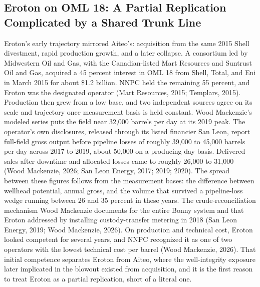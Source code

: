 \hypertarget{eroton-on-oml-18-a-partial-replication-complicated-by-a-shared-trunk-line}{%
\subsection{Eroton on OML 18: A Partial Replication Complicated by a
Shared Trunk
Line}\label{eroton-on-oml-18-a-partial-replication-complicated-by-a-shared-trunk-line}}

Eroton's early trajectory mirrored Aiteo's: acquisition from the same
2015 Shell divestment, rapid production growth, and a later collapse. A
consortium led by Midwestern Oil and Gas, with the Canadian-listed Mart
Resources and Suntrust Oil and Gas, acquired a 45 percent interest in
OML 18 from Shell, Total, and Eni in March 2015 for about \$1.2 billion.
NNPC held the remaining 55 percent, and Eroton was the designated
operator (Mart Resources, 2015; Templars, 2015). Production then grew
from a low base, and two independent sources agree on its scale and
trajectory once measurement basis is held constant. Wood Mackenzie's
modeled series puts the field near 32,000 barrels per day at its 2019
peak. The operator's own disclosures, released through its listed
financier San Leon, report full-field gross output before pipeline
losses of roughly 39,000 to 45,000 barrels per day across 2017 to 2019,
about 50,000 on a producing-day basis. Delivered sales after downtime
and allocated losses came to roughly 26,000 to 31,000 (Wood Mackenzie,
2026; San Leon Energy, 2017; 2019; 2020). The spread between these
figures follows from the measurement bases: the difference between
wellhead potential, annual gross, and the volume that survived a
pipeline-loss wedge running between 26 and 35 percent in these years.
The crude-reconciliation mechanism Wood Mackenzie documents for the
entire Bonny system and that Eroton addressed by installing
custody-transfer metering in 2018 (San Leon Energy, 2019; Wood
Mackenzie, 2026). On production and technical cost, Eroton looked
competent for several years, and NNPC recognized it as one of two
operators with the lowest technical cost per barrel (Wood Mackenzie,
2026). That initial competence separates Eroton from Aiteo, where the
well-integrity exposure later implicated in the blowout existed from
acquisition, and it is the first reason to treat Eroton as a partial
replication, short of a literal one.

